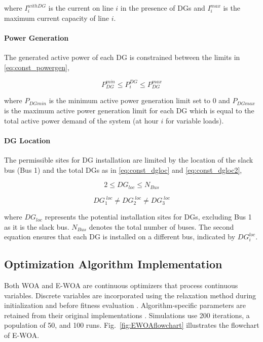 \documentclass[conference]{IEEEtran}
\begin{document}
where \(I_i^{withDG}\) is the current on line \(i\) in the presence of DGs and \(I_i^{max}\) is the maximum current capacity of line \(i\).

\paragraph{Power Generation}
The generated active power of each DG is constrained between the limits in \eqref{eq:const_powergen},

\begin{equation}
	P_{DG}^{min} \leq P_{i}^{DG} \leq P_{DG}^{max} 
	\label{eq:const_powergen}
\end{equation}

where $P_{DGmin}$ is the minimum active power generation limit set to $0$ and $P_{DGmax}$ is the maximum active power generation limit for each DG which is equal to the total active power demand of the system (at hour $i$ for variable loads).

\paragraph{DG Location}
The permissible sites for DG installation are limited by the location of the slack bus (Bus 1) and the total DGs as in \eqref{eq:const_dgloc} and \eqref{eq:const_dgloc2},

\begin{equation}
	2 \leq DG_{loc}\leq N_{Bus}
	\label{eq:const_dgloc}
\end{equation}

\begin{equation}
	DG_1^{\;loc} \ne DG_2^{\;loc} \ne DG_3^{\;loc}
	\label{eq:const_dgloc2}
\end{equation}

where \(DG_{loc}\) represents the potential installation sites for DGs, excluding Bus 1 as it is the slack bus. \(N_{Bus}\) denotes the total number of buses. The second equation ensures that each DG is installed on a different bus, indicated by \(DG_i^{loc}\).

\subsection{Optimization Algorithm Implementation}

Both WOA and E-WOA are continuous optimizers that process continuous variables. Discrete variables are incorporated using the relaxation method during initialization and before fitness evaluation \cite{relaxation}. Algorithm-specific parameters are retained from their original implementations \cite{WOA,EWOA}. Simulations use 200 iterations, a population of 50, and 100 runs. Fig.~\ref{fig:EWOAflowchart} illustrates the flowchart of E-WOA.
\end{document}
